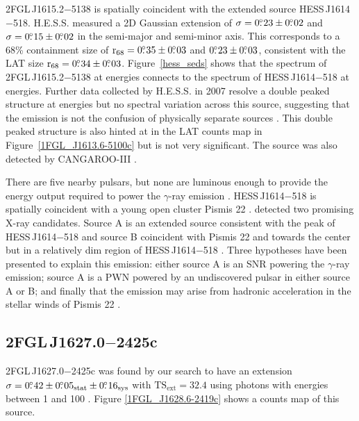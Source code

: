 \documentclass[12pt,preprint]{aastex}
\newcommand{\gev}{\text{GeV}\xspace}
\newcommand{\tev}{\text{TeV}\xspace}
\newcommand{\tsext}{{\ensuremath{\text{TS}_{\text{ext}}}}\xspace}
\newcommand{\suzaku}{\text{{\em Suzaku}}\xspace}
\newcommand{\rsixeight}{{\ensuremath{\text{r}_{68}}}\xspace}
\newcommand{\sys}{\text{sys}\xspace}
\newcommand{\stat}{\text{stat}\xspace}
\begin{document}
2FGL\,J1615.2$-$5138 is spatially coincident with 
the extended \tev source HESS\,J1614$-$518.
H.E.S.S. measured a 2D Gaussian extension of $\sigma=0\mbox{$.\!\!^\circ$}23\pm0\mbox{$.\!\!^\circ$}02$
and $\sigma=0\mbox{$.\!\!^\circ$}15\pm0\mbox{$.\!\!^\circ$}02$ in the semi-major and
semi-minor axis. This corresponds to a 68\% containment size of
$\rsixeight=0\fdg35\pm0\fdg03$ and $0\mbox{$.\!\!^\circ$}23\pm0\mbox{$.\!\!^\circ$}03$,  consistent with
the LAT size $\rsixeight=0\fdg34\pm0\fdg03$.  Figure~\ref{hess_seds}
shows that the spectrum of 2FGL\,J1615.2$-$5138 at \gev energies connects
to the spectrum of HESS\,J1614$-$518 at \tev energies.  Further data
collected by H.E.S.S. in 2007 resolve a double peaked structure at
\tev energies but no spectral variation across this source, suggesting
that the emission is not the confusion of physically separate sources
\citep{closer_look_hess_j1614-518}.  This double peaked structure is
also hinted at in the LAT counts map in Figure~\ref{1FGL_J1613.6-5100c}
but is not very significant.  The \tev source was also detected by
CANGAROO-III \citep{cangaroo_j1614-518}.

There are five nearby pulsars, but none are luminous enough to
provide the energy output required to power the $\gamma$-ray
emission \citep{closer_look_hess_j1614-518}.  HESS\,J1614$-$518
is spatially coincident with a young open cluster Pismis 22
\citep{hess_1614_landi_atel,closer_look_hess_j1614-518}.  \suzaku detected
two promising X-ray candidates. Source A is an extended source consistent
with the peak of HESS\,J1614$-$518 and source B coincident with Pismis 22
and towards the center but in a relatively dim region of HESS\,J1614$-$518
\citep{suazku_hess_j1614_518}.  Three hypotheses have been presented to
explain this emission: either source A is an SNR powering the $\gamma$-ray
emission; source A is a PWN powered by an undiscovered pulsar in either
source A or B; and finally that the emission may arise from hadronic
acceleration in the stellar winds of Pismis 22 \citep{cangaroo_j1614-518}.

\subsection{2FGL\,J1627.0$-$2425c}
\label{section_2FGL_J1627.0-2425c}


2FGL\,J1627.0$-$2425c was found by our search to
have an extension $\sigma=0\fdg42\pm0\fdg05_\stat\pm0\fdg16_\sys$ with
$\tsext=32.4$
using photons with energies between 1 \gev and 100 \gev.  
Figure \ref{1FGL_J1628.6-2419c} shows a counts map of this source.
\end{document}
